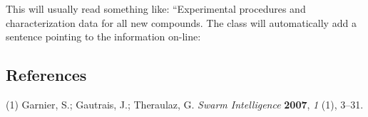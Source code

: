 \documentclass[journal=jacsat,manuscript=article]{achemso}
\begin{document}
\begin{suppinfo}

This will usually read something like: ``Experimental procedures and
characterization data for all new compounds. The class will
automatically add a sentence pointing to the information on-line:

\end{suppinfo}

\hypertarget{references-1}{%
\subsection*{References}\label{references-1}}

\hypertarget{refs}{}
\leavevmode\hypertarget{ref-Garnier2007}{}%
(1) Garnier, S.; Gautrais, J.; Theraulaz, G. \emph{Swarm Intelligence}
\textbf{2007}, \emph{1} (1), 3--31.
\end{document}
